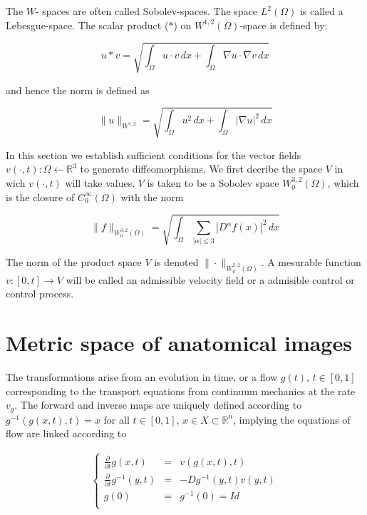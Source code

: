 \documentclass[final, paper=letter,5p,times,twocolumn]{elsarticle}
\theoremstyle{definition}
\begin{document}
The $W$- spaces are often called Sobolev-spaces. The space $L^{2}(\Omega)$ is called a Lebesgue-space.
The scalar product ($*$) on $W^{1,2}(\Omega)$-space is defined by:

$$
u*v = \sqrt{\int_{\Omega} u \cdot v \, dx + \int_{\Omega} \nabla u \cdot \nabla v \, dx}
$$

and hence the norm is defined as

$$
\| u \|_{W^{1,2}}= \sqrt{\int_{\Omega} u^{2} \, dx + \int_{\Omega} |\nabla u|^{2} \, dx}
$$

In this section we establish sufficient conditions for the vector fields $v(\cdot,t):\Omega \leftarrow \mathbb{R}^{3}$ to generate diffeomorphisms. We first decribe the space $V$ in wich $v(\cdot,t)$ will take values. $V$ is taken to be a Sobolev space $W_{0}^{3,2}(\Omega)$, which is the closure of $C_{0}^{\infty}(\Omega)$ with the norm

$$
\| f \|_{W_{0}^{3,2}(\Omega)} = \sqrt{\int_{\Omega} \sum_{| \alpha | \le 3 } |D^{\alpha} f(x)|^{2} \, dx }
$$

The norm of the product space $V$ is denoted $\| \cdot \|_{W_{0}^{3,2}(\Omega)}$. A mesurable function $v:[0,t] \rightarrow V$ will be called an admissible velocity field or a admisible control or control process.

\section{Metric space of anatomical images}

The transformations arise from an evolution in time, or a flow $g(t)$, $t \in [0, 1]$ corresponding to the transport equations from continuum mechanics at the rate $v_{g}$. The forward and inverse maps are uniquely defined according to $g^{-1}(g(x, t), t) = x$ for all $t \in [0, 1]$, $x \in X \subset \mathbb{R}^{n}$, implying the equations of flow are linked according to

\begin{eqnarray}
\left \lbrace
\begin{array}{rcl}
\frac{\partial}{\partial t}g(x,t) &=& v(g(x,t),t) \\
\frac{\partial}{\partial t}g^{-1}(y,t) &=& -Dg^{-1}(y,t)v(y,t) \\
g(0) &=& g^{-1}(0) = Id \\
\end{array}
\right .
\label{Metric}
\end{eqnarray}
\end{document}
